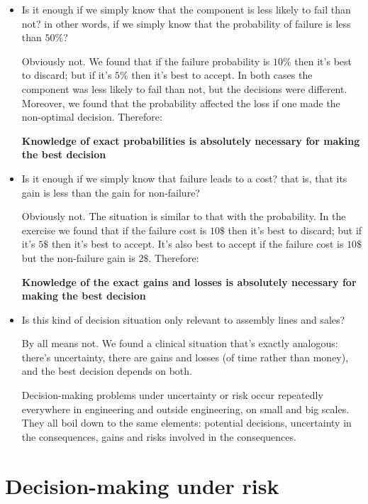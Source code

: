\documentclass[
  a4paper,
  DIV=11,
  numbers=noendperiod,
  oneside]{scrreprt}
\begin{document}
\begin{itemize}
\item
  Is it enough if we simply know that the component is less likely to
  fail than not? in other words, if we simply know that the probability
  of failure is less than \(50\%\)?

  Obviously not. We found that if the failure probability is \(10\%\)
  then it's best to discard; but if it's \(5\%\) then it's best to
  accept. In both cases the component was less likely to fail than not,
  but the decisions were different. Moreover, we found that the
  probability affected the loss if one made the non-optimal decision.
  Therefore:

  {\textbf{Knowledge of exact probabilities is absolutely necessary for
  making the best decision}}
\item
  Is it enough if we simply know that failure leads to a cost? that is,
  that its gain is less than the gain for non-failure?

  Obviously not. The situation is similar to that with the probability.
  In the exercise we found that if the failure cost is \(10\$\) then
  it's best to discard; but if it's \(5\$\) then it's best to accept.
  It's also best to accept if the failure cost is \(10\$\) but the
  non-failure gain is \(2\$\). Therefore:

  {\textbf{Knowledge of the exact gains and losses is absolutely
  necessary for making the best decision}}
\item
  Is this kind of decision situation only relevant to assembly lines and
  sales?

  By all means not. We found a clinical situation that's exactly
  analogous: there's uncertainty, there are gains and losses (of time
  rather than money), and the best decision depends on both.

  {Decision-making problems under uncertainty or risk occur repeatedly
  everywhere in engineering and outside engineering, on small and big
  scales. They all boil down to the same elements: potential decisions,
  uncertainty in the consequences, gains and risks involved in the
  consequences.}
\end{itemize}

\hypertarget{decision-making-under-risk}{%
\section{Decision-making under risk}\label{decision-making-under-risk}}
\end{document}
